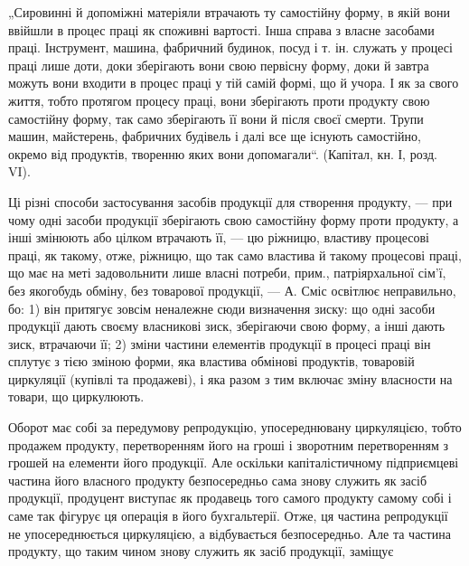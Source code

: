 „Сировинні й допоміжні матеріяли втрачають ту самостійну форму, в
якій вони ввійшли в процес праці як споживні вартості. Інша справа
з власне засобами праці. Інструмент, машина, фабричний будинок, посуд
і т. ін. служать у процесі праці лише доти, доки зберігають вони
свою первісну форму, доки й завтра можуть вони входити в процес праці
у тій самій формі, що й учора. І як за свого життя, тобто протягом
процесу праці, вони зберігають проти продукту свою самостійну форму,
так само зберігають її вони й після своєї смерти. Трупи машин, майстерень,
фабричних будівель і далі все ще існують самостійно, окремо
від продуктів, творенню яких вони допомагали“. (Капітал, кн. І, розд. VI).

Ці різні способи застосування засобів продукції для створення продукту,
— при чому одні засоби продукції зберігають свою самостійну форму
проти продукту, а інші змінюють або цілком втрачають її, — цю ріжницю,
властиву процесові праці, як такому, отже, ріжницю, що так само
властива й такому процесові праці, що має на меті задовольнити лише
власні потреби, прим., патріярхальної сім’ї, без якогобудь обміну, без
товарової продукції, — А. Сміс освітлює неправильно, бо: 1) він притягує
зовсім неналежне сюди визначення зиску: що одні засоби продукції дають
своєму власникові зиск, зберігаючи свою форму, а інші дають зиск,
втрачаючи її; 2) зміни частини елементів продукції в процесі праці він
сплутує з тією зміною форми, яка властива обмінові продуктів, товаровій
циркуляції (купівлі та продажеві), і яка разом з тим включає зміну
власности на товари, що циркулюють.

Оборот має собі за передумову репродукцію, упосереднювану циркуляцією,
тобто продажем продукту, перетворенням його на гроші і зворотним
перетворенням з грошей на елементи його продукції. Але оскільки
капіталістичному підприємцеві частина його власного продукту безпосередньо
сама знову служить як засіб продукції, продуцент виступає як
продавець того самого продукту самому собі і саме так фігурує ця операція
в його бухгальтерії. Отже, ця частина репродукції не упосереднюється
циркуляцією, а відбувається безпосередньо. Але та частина продукту,
що таким чином знову служить як засіб продукції, заміщує
\parbreak{}  %
